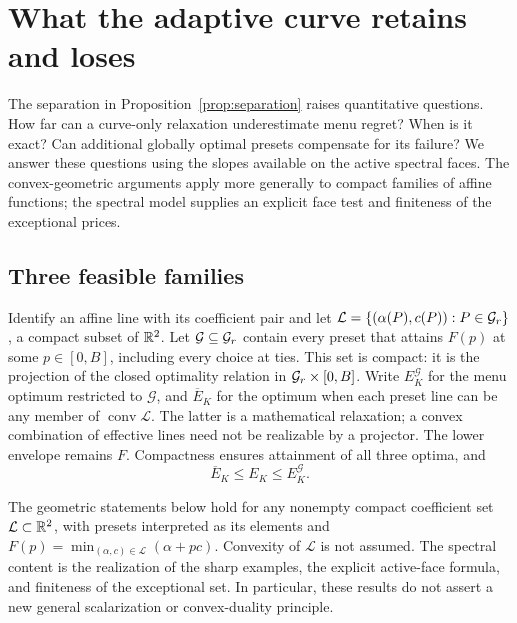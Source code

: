 \section{What the adaptive curve retains and loses}\label{sec:structure}
The separation in Proposition~\ref{prop:separation} raises quantitative
questions. How far can a curve-only relaxation underestimate menu regret?
When is it exact? Can additional globally optimal presets compensate for
its failure? We answer these questions using the slopes available on the
active spectral faces. The convex-geometric arguments apply more generally
to compact families of affine functions; the spectral model supplies an
explicit face test and finiteness of the exceptional prices.

\subsection{Three feasible families}
Identify an affine line with its coefficient pair and let
$\mathcal L=\{(\alpha(P),c(P)):P\in\mathcal G_r\}$, a compact subset of $\mathbb R^2$.
Let $\mathcal G\subseteq\mathcal G_r$ contain every preset that attains $F(p)$ at
some $p\in[0,B]$, including every choice at ties. This set is compact:
it is the projection of the closed optimality relation in
$\mathcal G_r\times[0,B]$. Write $E_K^{\mathcal G}$ for the menu optimum restricted
to $\mathcal G$, and $\overline E_K$ for the optimum when each preset line
can be any member of $\operatorname{conv}\mathcal L$. The latter is a
mathematical relaxation; a convex combination of effective lines need not
be realizable by a projector. The lower envelope remains $F$. Compactness
ensures attainment of all three optima, and
\begin{equation}\label{eq:threefamilies}
 \overline E_K\le E_K\le E_K^{\mathcal G}.
\end{equation}

The geometric statements below hold for any nonempty compact coefficient
set $\mathcal L\subset\mathbb R^2$, with presets interpreted as its elements and
$F(p)=\min_{(\alpha,c)\in\mathcal L}(\alpha+pc)$. Convexity of
$\mathcal L$ is not assumed. The spectral content is the realization of
the sharp examples, the explicit active-face formula, and finiteness of
the exceptional set. In particular, these results do not assert a new
general scalarization or convex-duality principle.

